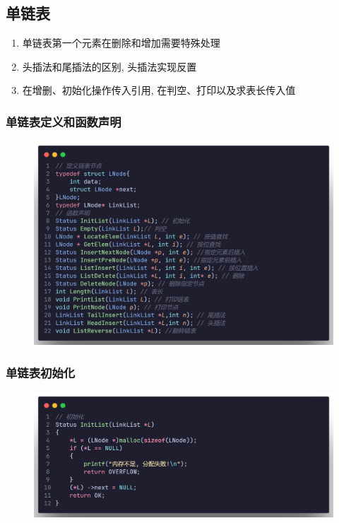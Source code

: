 \subsection{单链表}
\begin{definition}[单链表]
    \begin{enumerate}
        \item 单链表第一个元素在删除和增加需要特殊处理
        \item 头插法和尾插法的区别, 头插法实现反置
        \item 在增删、初始化操作传入引用, 在判空、打印以及求表长传入值
    \end{enumerate}
\end{definition}
\subsubsection{单链表定义和函数声明}

\begin{figure}[H]
    \centering
    \includegraphics[scale=0.2]{"figure/Note/LinearList/SlFunction.png"}
\end{figure} 

\subsubsection{单链表初始化}

\begin{figure}[H]
    \centering
    \includegraphics[scale=0.2]{"figure/Note/LinearList/SlInit.png"}
\end{figure} 

